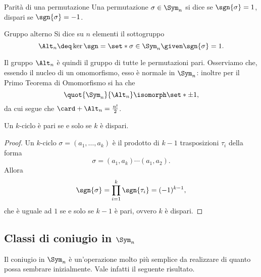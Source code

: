 \begin{definition}
    {Parità di una permutazione}{}
    Una permutazione $\sigma \in \Sym_n$ si dice  se $\sgn{\sigma} = 1$, dispari se $\sgn{\sigma} = -1$.  
\end{definition}

\begin{definition}
    {Gruppo alterno}{}
    Si dice  su $n$ elementi il sottogruppo \[
        \Alt_n \deq \ker \sgn = \set*{\sigma \in \Sym_n \given \sgn{\sigma} = 1}.
    \]
\end{definition}

Il gruppo $\Alt_n$ è quindi il gruppo di tutte le permutazioni pari. Osserviamo che, essendo il nucleo di un omomorfismo, esso è normale in $\Sym_n$: inoltre per il Primo Teorema di Omomorfismo si ha che \[
    \quot{\Sym_n}{\Alt_n} \isomorph \set*{\pm 1},
\] da cui segue che $\card+{\Alt_n} = \frac{n!}{2}$.

\begin{proposition}
    {}{}
    Un $k$-ciclo è pari se e solo se $k$ è dispari.
\end{proposition}
\begin{proof}
    Un $k$-ciclo $\sigma = (a_1, \dots, a_k)$ è il prodotto di $k-1$ trasposizioni $\tau_i$ della forma \[
        \sigma = (a_1, a_k) \cdots (a_1, a_{2}).
    \] Allora \[
        \sgn{\sigma} = \prod_{i=1}^k \sgn{\tau_i} = (-1)^{k-1},
    \] che è uguale ad $1$ se e solo se $k-1$ è pari, ovvero $k$ è dispari. 
\end{proof}

\subsection{Classi di coniugio in $\Sym_n$}

Il coniugio in $\Sym_n$ è un'operazione molto più semplice da realizzare di quanto possa sembrare inizialmente. Vale infatti il seguente risultato.

